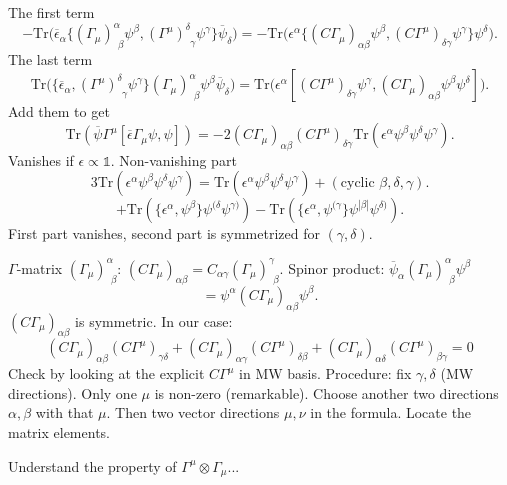 The first term
\[
	- \mathrm{Tr} \bigg( 	\overline{\epsilon}_\alpha
		\big\{ 
			(\Gamma_\mu)^\alpha_{~~\beta} \psi^\beta,
		 (\Gamma^\mu)^\delta_{~~\gamma} \psi^\gamma
	 \big\} 
	 \overline{\psi}_\delta 
 \bigg)
 = 
	- \mathrm{Tr} \bigg( 	\epsilon^\alpha
		\big\{ 
			(C\Gamma_\mu)_{\alpha\beta} \psi^\beta,
		 (C\Gamma^\mu)_{\delta\gamma} \psi^\gamma
	 \big\} 
	 \psi^\delta
 \bigg)
.\] 
The last term
\[
   \mathrm{Tr} \bigg(  	
	  \big\{ 
		 \overline{\epsilon}_\alpha, 
		 (\Gamma^\mu)^\delta_{~~\gamma}\psi^\gamma
	 \big\}
	(\Gamma_\mu)^\alpha_{~~\beta} \psi^\beta
	\overline{\psi}_\delta 	
\bigg)
=
   \mathrm{Tr} \bigg(  	
	  \epsilon^\alpha
		 \left[
		 (C\Gamma^\mu)_{\delta\gamma}\psi^\gamma,
	(C\Gamma_\mu)_{\alpha\beta} \psi^\beta
	\psi^\delta
\right]
\bigg)
.\] 
Add them to get
\[
	\mathrm{Tr}(\overline{\psi}\Gamma^\mu [ \overline{\epsilon}
	\Gamma_\mu \psi,\psi]) = 
	- 2 (C\Gamma_\mu)_{\alpha\beta} (C\Gamma^\mu)_{\delta\gamma}
	\mathrm{Tr}(\epsilon^\alpha \psi^\beta \psi^\delta \psi^\gamma)
.\] 
Vanishes if $\epsilon \propto \mathds{1}$. Non-vanishing part
\[
3\mathrm{Tr}(\epsilon^\alpha \psi^\beta \psi^\delta \psi^\gamma)
= \mathrm{Tr} (\epsilon^\alpha \psi^\beta \psi^\delta \psi^\gamma)
+ (\text{cyclic } \beta,\delta,\gamma)
.\] 
\[
	+ \mathrm{Tr}(\{\epsilon^\alpha,\psi^\beta\}\psi^{(\delta} \psi^{\gamma)})
	- \mathrm{Tr}(\{\epsilon^\alpha,\psi^{(\gamma}\}\psi^{|\beta|}
	\psi^{\delta)})
.\] 
First part vanishes, second part is symmetrized for $(\gamma,\delta)$.
\begin{info}
	$\Gamma$-matrix $(\Gamma_\mu)^\alpha_{~~\beta}$:
	$(C\Gamma_\mu)_{\alpha\beta} = C_{\alpha \gamma} 
	(\Gamma_\mu)^\gamma_{~~\beta}$.
	Spinor product: $\overline{\psi}_{\alpha}(\Gamma_\mu)^\alpha_{~~\beta}
	\psi^\beta$
	\[
	=	\psi^\alpha (C\Gamma_\mu)_{\alpha\beta} \psi^\beta
	.\] 
	$(C\Gamma_\mu)_{\alpha\beta}$ is symmetric.
	In our case:
	\begin{equation*}
		(C\Gamma_\mu)_{\alpha\beta} (C\Gamma^\mu)_{\gamma\delta}
		+ (C\Gamma_\mu)_{\alpha\gamma} (C\Gamma^\mu)_{\delta\beta}
		+ (C\Gamma_\mu)_{\alpha\delta} (C\Gamma^\mu)_{\beta\gamma}
		=0
	\end{equation*}
	Check by looking at the explicit $C\Gamma^\mu$ in MW basis.
	Procedure: fix $\gamma,\delta$ (MW directions).
	Only one $\mu$ is non-zero (remarkable).
	Choose another two directions $\alpha,\beta$ with that $\mu$.
	Then two vector directions $\mu,\nu$ in the formula.
	Locate the matrix elements.
\end{info}
Understand the property of $\Gamma^\mu \otimes \Gamma_\mu$...

